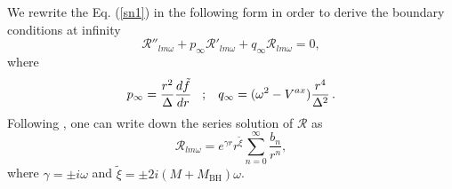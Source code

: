 \documentclass[11pt]{article}
\begin{document}
We rewrite the Eq. (\ref{sn1}) in the following form in order to derive the boundary conditions at infinity
\begin{equation}
\mathcal{R}''_{lm\omega}+p_{\infty}\mathcal{R}'_{lm\omega}+q_{\infty}\mathcal{R}_{lm\omega} = 0 , 
\end{equation}
where 
\begin{align}
p_{\infty} = \frac{r^{2}}{\Delta}\frac{d\tilde{f}}{dr} \hspace{3mm} ; \hspace{3mm} q_{\infty} = (\omega^{2}-V^{ax})\frac{r^{4}}{\Delta^{2}}\,.
\end{align}
Following \cite{Pani}, one can write down the series solution of $\mathcal{R}$ as
\begin{equation}\label{bc_axial_inf}
\mathcal{R}_{lm\omega} = e^{\gamma r} r^{\tilde{\xi}} \displaystyle\sum_{n=0}^{\infty} \frac{b_n}{r^n} ,
\end{equation}
where $\gamma = \pm  i\omega$ and  $\tilde{\xi} = \pm 2i (M+M_{\textrm{BH}}) \omega $.
\end{document}
